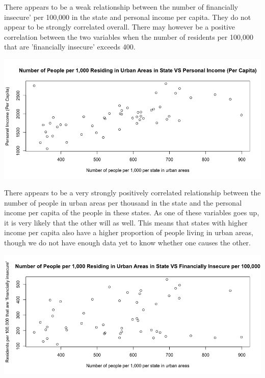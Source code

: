 \documentclass[12pt,letterpaper]{article}
\begin{document}
\noindent
There appears to be a weak relationship between the number of financially insecure' per 100,000 in the state and personal income per capita. They do not appear to be strongly correlated overall. There may however be a positive correlation between the two variables when the number of residents per 100,000 that are 'financially insecure' exceeds 400.
\\\vspace{.5cm}



\newpage

\includegraphics[width=150mm]{Rplot X3 against X1}

\noindent
There appears to be a very strongly positively correlated relationship between the number of people in urban areas per thousand in the state and the personal income per capita of the people in these states. As one of these variables goes up, it is very likely that the other will as well. This means that states with higher income per capita also have a higher proportion of people living in urban areas, though we do not have enough data yet to know whether one causes the other. 
\\\vspace{.5cm}



\newpage

\includegraphics[width=150mm]{Rplot X3 against X2}
\end{document}
